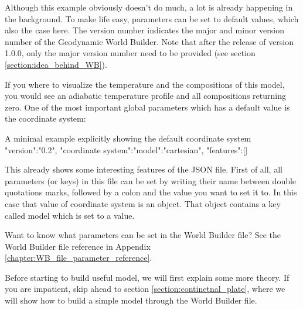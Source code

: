 \documentclass{book}
\newcommand{\GWB}{{Geodynamic World Builder}}
\newcommand{\WB}{{World Builder}}
\begin{document}
Although this example obviously doesn't do much, a lot is already happening in the background. To make life easy, parameters can be set to default values, which also the case here. The version number indicates the major and minor version number of the \GWB{}. Note that after the release of version 1.0.0, only the major version number need to be provided (see section \ref{section:idea_behind_WB}).

If you where to visualize the temperature and the compositions of this model, you would see an adiabatic temperature profile and all compositions returning zero. One of the most important global parameters which has a default value is the coordinate system:

\begin{javascriptcode}[label={lst:code_minimal_example_default_coordinate_system}]{A minimal example explicitly showing the default coordinate system}{}
{
  "version":"0.2",
  "coordinate system":{"model":"cartesian"},
  "features":[]
}
\end{javascriptcode}

This already shows some interesting features of the JSON file. First of all, all parameters (or keys) in this file can be set by writing their name between double quotations marks, followed by a colon and the value you want to set it to. In this case that value of coordinate system is an object. That object contains a key called model which is set to a value.
\begin{remark}
Want to know what parameters can be set in the \WB{} file? See the \WB{} file reference in Appendix \ref{chapter:WB_file_parameter_reference}.
\end{remark}
\begin{remark}
Before starting to build useful model, we will first explain some more theory. If you are impatient, skip ahead to section \ref{section:continetnal_plate}, where we will show how to build a simple model through the \WB{} file. 
\end{remark}
\end{document}
